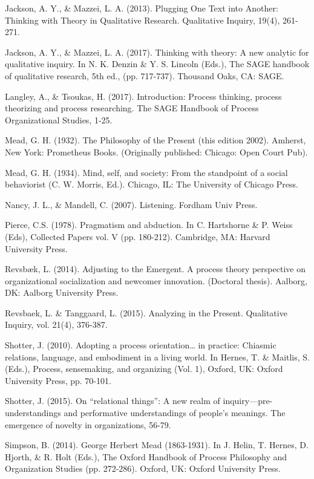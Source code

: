\begin{thebibliography}{99}
\item Jackson, A. Y., \& Mazzei, L. A. (2013). Plugging One Text into Another: Thinking with Theory in Qualitative Research. Qualitative Inquiry, 19(4), 261-271.
\item Jackson, A. Y., \& Mazzei, L. A. (2017). Thinking with theory: A new analytic for qualitative inquiry. In N. K. Denzin \& Y. S. Lincoln (Eds.), The SAGE handbook of qualitative research, 5th ed., (pp. 717-737). Thousand Oaks, CA: SAGE.
\item Langley, A., \& Tsoukas, H. (2017). Introduction: Process thinking, process theorizing and process researching. The SAGE Handbook of Process Organizational Studies, 1-25.
\item Mead, G. H. (1932). The Philosophy of the Present (this edition 2002). Amherst, New York: Prometheus Books. (Originally published: Chicago: Open Court Pub).
\item Mead, G. H. (1934). Mind, self, and society: From the standpoint of a social behaviorist (C. W. Morris, Ed.). Chicago, IL: The University of Chicago Press.
\item Nancy, J. L., \& Mandell, C. (2007). Listening. Fordham Univ Press.
\item Pierce, C.S. (1978). Pragmatism and abduction. In C. Hartshorne \& P. Weiss (Eds), Collected Papers vol. V (pp. 180-212). Cambridge, MA: Harvard University Press.
\item Revsbæk, L. (2014). Adjusting to the Emergent. A process theory perspective on organizational socialization and newcomer innovation. (Doctoral thesis). Aalborg, DK: Aalborg University Press.
\item Revsbaek, L. \& Tanggaard, L. (2015). Analyzing in the Present. Qualitative Inquiry, vol. 21(4), 376-387.
\item Shotter, J. (2010). Adopting a process orientation… in practice: Chiasmic relations, language, and embodiment in a living world. In Hernes, T. \& Maitlis, S. (Eds.), Process, sensemaking, and organizing (Vol. 1), Oxford, UK: Oxford University Press, pp. 70-101.
\item Shotter, J. (2015). On “relational things”: A new realm of inquiry—pre-understandings and performative understandings of people’s meanings. The emergence of novelty in organizations, 56-79.
\item Simpson, B. (2014). George Herbert Mead (1863-1931). In J. Helin, T. Hernes, D. Hjorth, \& R. Holt (Eds.), The Oxford Handbook of Process Philosophy and Organization Studies (pp. 272-286). Oxford, UK: Oxford University Press.

\end{thebibliography}
